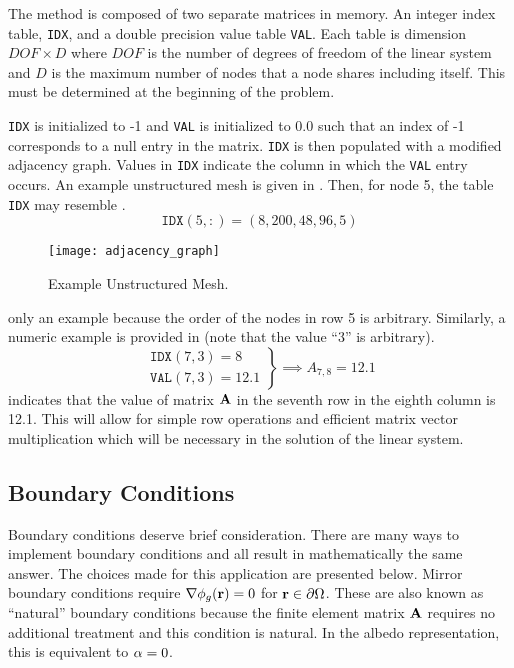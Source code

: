     The \twotable method is composed of two separate matrices in memory. An 
    integer index table, \texttt{IDX}, and a double precision value table
    \texttt{VAL}. Each table is dimension $DOF \times D$ where $DOF$ is the
    number of degrees of freedom of the linear system and $D$ is the maximum
    number of nodes that a node shares including itself. This must be determined
    at the beginning of the problem.
    
    \texttt{IDX} is initialized to -1 and \texttt{VAL} is initialized 
    to 0.0 such that an index of -1 corresponds to a null entry in the 
    matrix. \texttt{IDX} is then populated with a modified adjacency graph. 
    Values in \texttt{IDX} indicate the column in which the \texttt{VAL} entry
    occurs. An example unstructured mesh is given in . 
    Then, for node 5, the table \texttt{IDX} may resemble .
    \begin{equation}
      \label{eq:idx_example}
      \texttt{IDX}(5,:) = (8, 200, 48, 96, 5 )
    \end{equation}
    \begin{figure}
      \centering
      \texttt{[image: adjacency\_graph]}
      \caption{Example Unstructured Mesh.}
      \label{fig:adjacency_graph}
    \end{figure}
     only an example because the order of the nodes in row
    5 is arbitrary. Similarly, a numeric example is provided in 
     (note that the value ``3'' is arbitrary).
    \begin{equation}
      \label{eq:idx_number}
      \left.
      \begin{array}{c}
        \texttt{IDX}(7,3) = 8 \\
        \texttt{VAL}(7,3) = 12.1
      \end{array}
      \right\}
      \implies
      A_{7,8} = 12.1
    \end{equation}
     indicates that the value of matrix $\mathbf{A}$ in the
    seventh row in the eighth column is 12.1. This will allow for simple row 
    operations and efficient matrix vector multiplication which will be 
    necessary in the solution of the linear system.

  \subsection{Boundary Conditions}
    \label{sec:boundary_conditions}
    Boundary conditions deserve brief consideration. There are many ways to 
    implement boundary conditions and all result in mathematically the same 
    answer. The choices made for this application are presented below. Mirror 
    boundary conditions require $\mathbf{\nabla} \phi_g(\mathbf{r}) = 0$ for 
    $\mathbf{r} \in \partial \Omega$. These are also known as ``natural'' boundary
    conditions because the finite element matrix $\mathbf{A}$ requires no additional 
    treatment and this condition is natural. In the albedo representation, this
    is equivalent to $\alpha = 0$.
    
